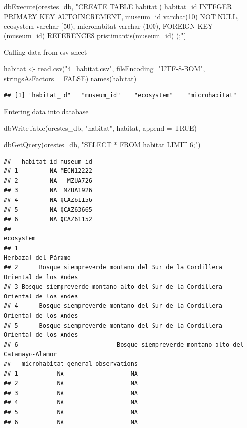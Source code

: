 \documentclass[
]{book}
\newenvironment{Shaded}{\begin{snugshade}}{\end{snugshade}}
\newcommand{\AttributeTok}[1]{\textcolor[rgb]{0.77,0.63,0.00}{#1}}
\newcommand{\ConstantTok}[1]{\textcolor[rgb]{0.00,0.00,0.00}{#1}}
\newcommand{\FunctionTok}[1]{\textcolor[rgb]{0.00,0.00,0.00}{#1}}
\newcommand{\NormalTok}[1]{#1}
\newcommand{\OtherTok}[1]{\textcolor[rgb]{0.56,0.35,0.01}{#1}}
\newcommand{\StringTok}[1]{\textcolor[rgb]{0.31,0.60,0.02}{#1}}
\begin{document}
\begin{Shaded}
\begin{Highlighting}[]
\FunctionTok{dbExecute}\NormalTok{(orestes\_db, }\StringTok{"CREATE TABLE habitat (}
\StringTok{habitat\_id INTEGER PRIMARY KEY AUTOINCREMENT,}
\StringTok{museum\_id varchar(10) NOT NULL,}
\StringTok{ecosystem varchar (50), }
\StringTok{microhabitat varchar (100), }
\StringTok{FOREIGN KEY (museum\_id) REFERENCES pristimantis(museum\_id)}
\StringTok{);"}\NormalTok{)}
\end{Highlighting}
\end{Shaded}

Calling data from csv sheet

\begin{Shaded}
\begin{Highlighting}[]
\NormalTok{habitat }\OtherTok{\textless{}{-}} \FunctionTok{read.csv}\NormalTok{(}\StringTok{"4\_habitat.csv"}\NormalTok{, }\AttributeTok{fileEncoding=}\StringTok{"UTF{-}8{-}BOM"}\NormalTok{, }
                   \AttributeTok{stringsAsFactors =} \ConstantTok{FALSE}\NormalTok{) }
\FunctionTok{names}\NormalTok{(habitat)}
\end{Highlighting}
\end{Shaded}

\begin{verbatim}
## [1] "habitat_id"   "museum_id"    "ecosystem"    "microhabitat"
\end{verbatim}

Entering data into database

\begin{Shaded}
\begin{Highlighting}[]
\FunctionTok{dbWriteTable}\NormalTok{(orestes\_db, }\StringTok{"habitat"}\NormalTok{, habitat, }\AttributeTok{append =} \ConstantTok{TRUE}\NormalTok{)}

\FunctionTok{dbGetQuery}\NormalTok{(orestes\_db, }\StringTok{"SELECT * FROM habitat LIMIT 6;"}\NormalTok{)}
\end{Highlighting}
\end{Shaded}

\begin{verbatim}
##   habitat_id museum_id
## 1         NA MECN12222
## 2         NA   MZUA726
## 3         NA  MZUA1926
## 4         NA QCAZ61156
## 5         NA QCAZ63665
## 6         NA QCAZ61152
##                                                                         ecosystem
## 1                                                             Herbazal del Páramo
## 2      Bosque siempreverde montano del Sur de la Cordillera Oriental de los Andes
## 3 Bosque siempreverde montano alto del Sur de la Cordillera Oriental de los Andes
## 4      Bosque siempreverde montano del Sur de la Cordillera Oriental de los Andes
## 5      Bosque siempreverde montano del Sur de la Cordillera Oriental de los Andes
## 6                            Bosque siempreverde montano alto del Catamayo-Alamor
##   microhabitat general_observations
## 1           NA                   NA
## 2           NA                   NA
## 3           NA                   NA
## 4           NA                   NA
## 5           NA                   NA
## 6           NA                   NA
\end{verbatim}
\end{document}
